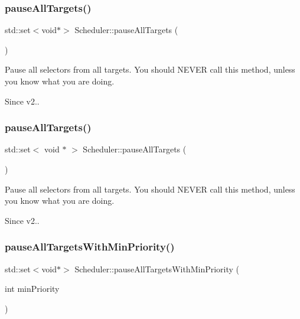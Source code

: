 \subsubsection{\texorpdfstring{pause\+All\+Targets()}{pauseAllTargets()}\hspace{0.1cm}{\footnotesize\ttfamily [1/2]}}
{\footnotesize\ttfamily std\+::set$<$void$\ast$$>$ Scheduler\+::pause\+All\+Targets (\begin{DoxyParamCaption}{ }\end{DoxyParamCaption})}

Pause all selectors from all targets. You should N\+E\+V\+ER call this method, unless you know what you are doing. \begin{DoxySince}{Since}
v2.. 
\end{DoxySince}
\mbox{\label{classScheduler_a5a624f0bf247439e11f45388dce5d465}} 
\subsubsection{\texorpdfstring{pause\+All\+Targets()}{pauseAllTargets()}\hspace{0.1cm}{\footnotesize\ttfamily [2/2]}}
{\footnotesize\ttfamily std\+::set$<$ void $\ast$ $>$ Scheduler\+::pause\+All\+Targets (\begin{DoxyParamCaption}{ }\end{DoxyParamCaption})}

Pause all selectors from all targets. You should N\+E\+V\+ER call this method, unless you know what you are doing. \begin{DoxySince}{Since}
v2.. 
\end{DoxySince}
\mbox{\label{classScheduler_a306504d4f42cbe75cbe948b0d64d2750}} 
\subsubsection{\texorpdfstring{pause\+All\+Targets\+With\+Min\+Priority()}{pauseAllTargetsWithMinPriority()}\hspace{0.1cm}{\footnotesize\ttfamily [1/2]}}
{\footnotesize\ttfamily std\+::set$<$void$\ast$$>$ Scheduler\+::pause\+All\+Targets\+With\+Min\+Priority (\begin{DoxyParamCaption}\item[{int}]{min\+Priority }\end{DoxyParamCaption})}

